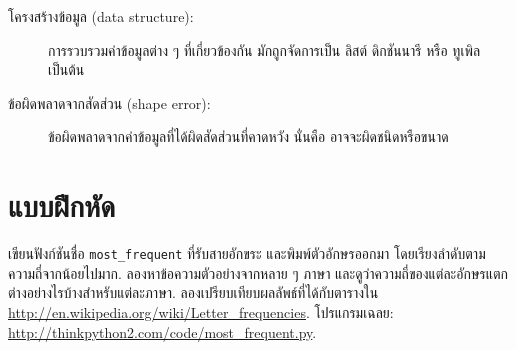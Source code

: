 \begin{description}
\item[โครงสร้างข้อมูล (data structure):] 
การรวบรวมค่าข้อมูลต่าง ๆ ที่เกี่ยวข้องกัน
มักถูกจัดการเป็น ลิสต์ ดิกชันนารี หรือ ทูเพิล เป็นต้น

\item[ข้อผิดพลาดจากสัดส่วน (shape error):] 
ข้อผิดพลาดจากค่าข้อมูลที่ได้ผิดสัดส่วนที่คาดหวัง
นั่นคือ อาจจะผิดชนิดหรือขนาด

\end{description}

\section{แบบฝึกหัด}

\begin{exercise}


เขียนฟังก์ชันชื่อ \verb|most_frequent| ที่รับสายอักขระ
และพิมพ์ตัวอักษรออกมา โดยเรียงลำดับตามความถี่จากน้อยไปมาก.
ลองหาข้อความตัวอย่างจากหลาย ๆ ภาษา 
และดูว่าความถี่ของแต่ละอักษรแตกต่างอย่างไรบ้างสำหรับแต่ละภาษา.
ลองเปรียบเทียบผลลัพธ์ที่ได้กับตารางใน
\url{http://en.wikipedia.org/wiki/Letter_frequencies}.  
โปรแกรมเฉลย:
\url{http://thinkpython2.com/code/most_frequent.py}.   


\end{exercise}
\vspace{0.5cm}


